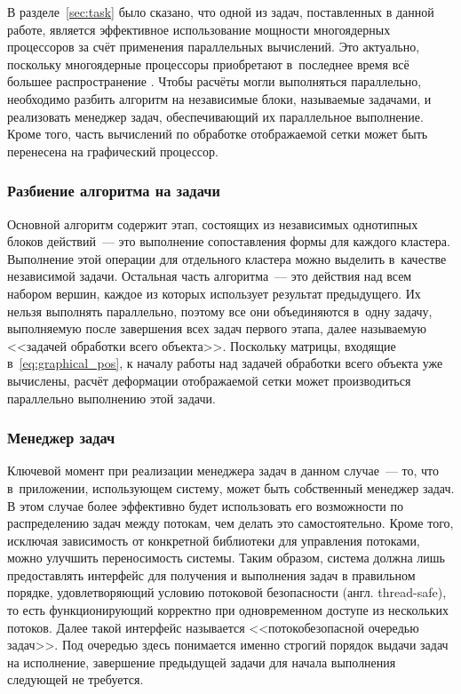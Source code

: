\documentclass[a4paper, 14pt, titlepage]{extarticle}
\newcommand{\eng}[1]{{\English #1}}
\begin{document}
      В разделе~\ref{sec:task} было сказано, что одной из задач, поставленных в данной работе, является эффективное использование
      мощности многоядерных процессоров за счёт применения параллельных вычислений.
      Это актуально, поскольку многоядерные процессоры
      приобретают в~последнее время всё большее распространение \cite{steam-hardware}.
      Чтобы расчёты могли выполняться параллельно, необходимо разбить алгоритм на независимые
      блоки, называемые задачами, и реализовать менеджер задач, обеспечивающий их параллельное
      выполнение. Кроме того, часть вычислений по обработке отображаемой сетки может быть перенесена
      на графический процессор.

      \subsubsection{Разбиение алгоритма на задачи}

        Основной алгоритм содержит этап, состоящих из независимых однотипных блоков
        действий~--- это выполнение сопоставления формы для каждого кластера. Выполнение этой
        операции для отдельного кластера можно выделить в~качестве независимой задачи. Остальная
        часть алгоритма~--- это действия над всем набором вершин, каждое из которых использует
        результат предыдущего. Их нельзя выполнять параллельно, поэтому все они объединяются в~одну
        задачу, выполняемую после завершения всех задач первого этапа, далее называемую <<задачей
        обработки всего объекта>>. Поскольку матрицы, входящие
        в~\eqref{eq:graphical_pos}, к началу работы над задачей обработки всего объекта уже вычислены,
        расчёт деформации отображаемой сетки может производиться параллельно выполнению этой задачи.

      \subsubsection{Менеджер задач}\label{sssec:task_manager}

        Ключевой момент при реализации менеджера задач в данном случае~--- то, что в~приложении,
        использующем систему, может быть собственный менеджер задач. В этом случае более эффективно
        будет использовать его возможности по распределению задач между потокам, чем делать это
        самостоятельно. Кроме того, исключая зависимость от конкретной библиотеки для управления
        потоками, можно улучшить переносимость системы. Таким образом, система должна лишь
        предоставлять интерфейс для получения и выполнения задач в правильном порядке,
        удовлетворяющий условию потоковой безопасности (англ. \eng{thread-safe}), то есть
        функционирующий корректно при одновременном доступе из нескольких потоков. Далее такой
        интерфейс называется <<потокобезопасной очередью задач>>. Под очередью здесь понимается именно строгий порядок выдачи
        задач на исполнение, завершение предыдущей задачи для начала выполнения следующей не требуется.
\end{document}
